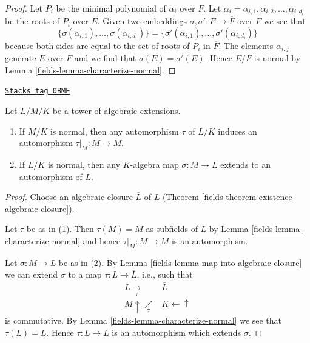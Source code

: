 \begin{proof}

Let $P_i$ be the minimal polynomial of $\alpha_i$ over $F$.
Let $\alpha_i = \alpha_{i, 1}, \alpha_{i, 2}, \ldots, \alpha_{i, d_i}$
be the roots of $P_i$ over $E$. Given two embeddings
$\sigma, \sigma' : E \to \overline{F}$ over $F$ we see that
$$
\{\sigma(\alpha_{i, 1}), \ldots, \sigma(\alpha_{i, d_i})\} =
\{\sigma'(\alpha_{i, 1}), \ldots, \sigma'(\alpha_{i, d_i})\}
$$
because both sides are equal to the set of roots of $P_i$
in $\overline{F}$. The elements $\alpha_{i, j}$
generate $E$ over $F$ and we find that $\sigma(E) = \sigma'(E)$.
Hence $E/F$ is normal by Lemma \ref{fields-lemma-characterize-normal}.
\end{proof}

\begin{lemma}
\label{fields-lemma-lift-maps}
\href{https://stacks.math.columbia.edu/tag/0BME}{\texttt{Stacks tag 0BME}}

Let $L/M/K$ be a tower of algebraic extensions.
\begin{enumerate}
\item If $M/K$ is normal, then any automorphism $\tau$ of $L/K$
induces an automorphism $\tau|_M : M \to M$.
\item If $L/K$ is normal, then any $K$-algebra map $\sigma : M \to L$
extends to an automorphism of $L$.
\end{enumerate}
\end{lemma}

\begin{proof}

Choose an algebraic closure $\overline{L}$ of $L$
(Theorem \ref{fields-theorem-existence-algebraic-closure}).

\medskip\noindent
Let $\tau$ be as in (1). Then $\tau(M) = M$ as subfields of $\overline{L}$
by Lemma \ref{fields-lemma-characterize-normal} and hence
$\tau|_M : M \to M$ is an automorphism.

\medskip\noindent
Let $\sigma : M \to L$ be as in (2).
By Lemma \ref{fields-lemma-map-into-algebraic-closure}
we can extend $\sigma$ to a map
$\tau : L \to \overline{L}$, i.e., such that
$$
\begin{array}{cc}L \underset{\tau}{\longrightarrow} & \overline{L} \\ M \uparrow\underset{\sigma}{\nearrow} & K \longleftarrow\uparrow\end{array}
$$
is commutative. By Lemma \ref{fields-lemma-characterize-normal} we see that
$\tau(L) = L$. Hence $\tau : L \to L$ is an automorphism which
extends $\sigma$.
\end{proof}


